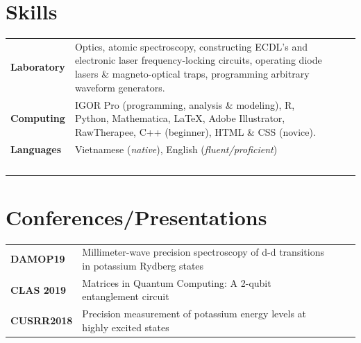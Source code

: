 \documentclass[a4paper, 10.5pt]{article}
\begin{document}
	\section*{\normalsize{{\color{colby}Skills}}}
		\begin{tabular}{lp{13.5cm}lp{8in}}
			
			\textbf{Laboratory} & Optics, atomic spectroscopy, constructing ECDL's and electronic laser frequency-locking circuits, operating diode lasers \& magneto-optical traps, programming arbitrary waveform generators.\\
			
			\textbf{Computing} & IGOR Pro (programming, analysis \& modeling), R, Python, Mathematica, \LaTeX{}, Adobe Illustrator, RawTherapee, C++ (beginner), HTML \& CSS (novice).\\
			
			
			\textbf{Languages} & Vietnamese (\textit{native}), English (\textit{fluent/proficient})\\
			$\,$
		\end{tabular}
	
	\section*{\normalsize{{\color{colby}Conferences/Presentations}}}
		\begin{tabular}{lp{13.5cm}lp{8in}}
			\textbf{DAMOP19} & Millimeter-wave precision spectroscopy of d-d transitions in potassium Rydberg states \\
			\textbf{CLAS 2019} & Matrices in Quantum Computing: A 2-qubit entanglement circuit\\
			\textbf{CUSRR2018} & Precision measurement of potassium energy levels at highly excited states\\
		\end{tabular}
	
\end{document}
